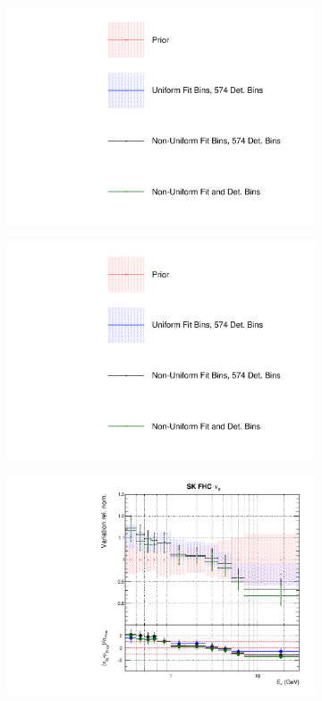 \begin{figure}[!htbp]
\centering
\begin{subfigure}{0.3\textwidth}
  \centering
  \includegraphics[width=1.0\linewidth,  trim={5mm  80mm 0mm 0mm}, clip]{figs/polyasmvs_leg}
\end{subfigure}
\begin{subfigure}{0.3\textwidth}
  \centering
  \includegraphics[width=1.0\linewidth,  trim={5mm  0mm 0mm 95mm}, clip]{figs/polyasmvs_leg}
\end{subfigure}
\begin{subfigure}{0.45\textwidth}
  \centering
  \includegraphics[width=0.75\linewidth]{figs/polydataflux_8}

\end{subfigure}
\end{figure}
